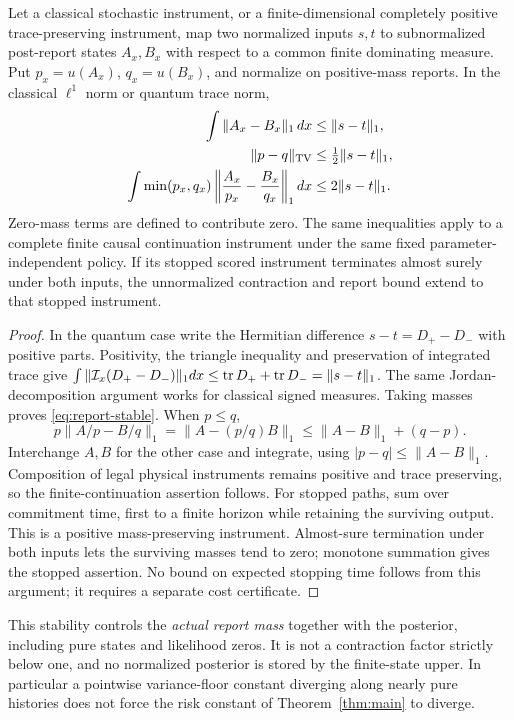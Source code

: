 \begin{proposition}\label{prop:instrument}
Let a classical stochastic instrument, or a finite-dimensional completely positive trace-preserving instrument, map two normalized inputs $s,t$ to subnormalized post-report states $A_x,B_x$ with respect to a common finite dominating measure. Put $p_x=u(A_x)$, $q_x=u(B_x)$, and normalize on positive-mass reports. In the classical $\ell^1$ norm or quantum trace norm,
\begin{align}
 \int\|A_x-B_x\|_1\,dx&\le\|s-t\|_1,\label{eq:unnorm-stable}\\
 \|p-q\|_{\mathrm{TV}}&\le\tfrac12\|s-t\|_1,\label{eq:report-stable}\\
 \int\min(p_x,q_x)\left\|\frac{A_x}{p_x}-\frac{B_x}{q_x}\right\|_1dx
 &\le2\|s-t\|_1.\label{eq:weighted-stable}
\end{align}
Zero-mass terms are defined to contribute zero. The same inequalities apply to a complete finite causal continuation instrument under the same fixed parameter-independent policy. If its stopped scored instrument terminates almost surely under both inputs, the unnormalized contraction and report bound extend to that stopped instrument.
\end{proposition}
\begin{proof}
In the quantum case write the Hermitian difference $s-t=D_+-D_-$ with positive parts. Positivity, the triangle inequality and preservation of integrated trace give
$\int\|\mathcal I_x(D_+-D_-)\|_1dx\le\operatorname{tr} D_++\operatorname{tr} D_-=\|s-t\|_1$.
The same Jordan-decomposition argument works for classical signed measures. Taking masses proves \eqref{eq:report-stable}. When $p\le q$,
\[
 p\|A/p-B/q\|_1=\|A-(p/q)B\|_1
 \le\|A-B\|_1+(q-p).
\]
Interchange $A,B$ for the other case and integrate, using $|p-q|\le\|A-B\|_1$. Composition of legal physical instruments remains positive and trace preserving, so the finite-continuation assertion follows. For stopped paths, sum over commitment time, first to a finite horizon while retaining the surviving output. This is a positive mass-preserving instrument. Almost-sure termination under both inputs lets the surviving masses tend to zero; monotone summation gives the stopped assertion. No bound on expected stopping time follows from this argument; it requires a separate cost certificate.
\end{proof}

This stability controls the \emph{actual report mass} together with the posterior, including pure states and likelihood zeros. It is not a contraction factor strictly below one, and no normalized posterior is stored by the finite-state upper. In particular a pointwise variance-floor constant diverging along nearly pure histories does not force the risk constant of Theorem~\ref{thm:main} to diverge.
